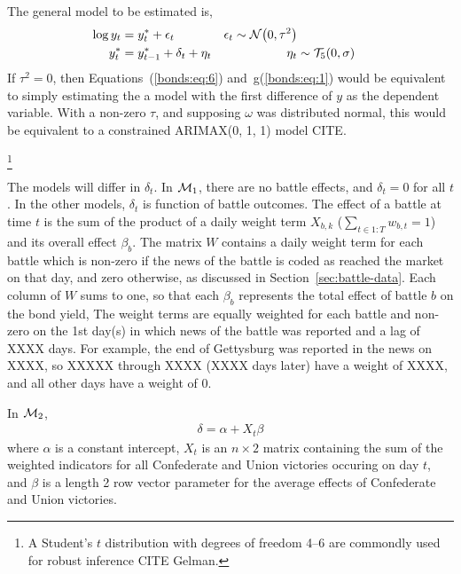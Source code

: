 The general model to be estimated is,
\begin{align}
  \label{bonds:eq:6}
  \log y_{t} &= y^{*}_{t} + \epsilon_{t} & \epsilon_{t} \sim \mathcal{N}\mathopen{}\left(0, \tau^{2}\right)\mathclose{} \\
  \label{bonds:eq:1}
  y^{*}_{t} &= y^{*}_{t - 1} + \delta_{t} + \eta_{t} & \eta_{t} &\sim \mathcal{T}_{5}\mathopen{}\left(0, \sigma\right)\mathclose{}
\end{align}
If $\tau^{2} = 0$, then Equations~(\ref{bonds:eq:6}) and~g(\ref{bonds:eq:1}) would be equivalent to simply estimating the a model with the first difference of $y$ as the dependent variable.
With a non-zero $\tau$, and supposing $\omega$ was distributed normal, this would be equivalent to a constrained ARIMAX(0, 1, 1) model CITE.

\footnote{A Student's $t$ distribution with degrees of freedom 4--6 are commondly used for robust inference CITE Gelman.}

The models will differ in $\delta_{t}$.
In $\mathcal{M}_{\text{1}}$, there are no battle effects, and $\delta_{t} = 0$ for all $t$.
In the other models, $\delta_{t}$ is function of battle outcomes.
The effect of a battle at time $t$ is the sum of the product of a daily weight term $X_{b,k}$ ($\sum_{t \in 1:T} w_{b,t} = 1$) and its overall effect $\beta_{b}$.
The matrix $W$ contains a daily weight term for each battle which is non-zero if the news of the battle is coded as reached the market on that day, and zero otherwise, as discussed in Section~\ref{sec:battle-data}.
Each column of $W$ sums to one, so that each $\beta_{b}$ represents the total effect of battle $b$ on the bond yield,
The weight terms are equally weighted for each battle and non-zero on the 1st day(s) in which news of the battle was reported and a lag of XXXX days.
For example, the end of Gettysburg was reported in the news on XXXX, so XXXXX through XXXX (XXXX days later) have a weight of XXXX, and all other days have a weight of 0.

In $\mathcal{M}_{\text{2}}$,
\begin{align}
  \label{bonds:eq:2}
  \delta = \alpha + X_{t} \beta
\end{align}
where $\alpha$ is a constant intercept, $X_{t}$ is an $n \times 2$ matrix containing the sum of the weighted indicators for all Confederate and Union victories occuring on day $t$,
and $\beta$ is a length 2 row vector parameter for the average effects of Confederate and Union victories.

